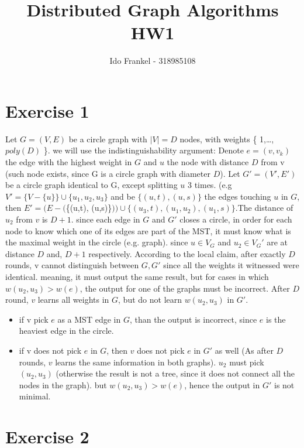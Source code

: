 \documentclass[11pt]{article}
\begin{document}
\author{Ido Frankel - 318985108}
\title{Distributed Graph Algorithms HW1}
\maketitle

\medskip

\section{Exercise 1}
Let $G=(V,E)$ be a circle graph with $|V|=D$ nodes, with weights \{ 1,…, $poly(D)$ \}. we will use the indistinguishability argument: Denote $e=(v,v_k)$ the edge with the highest weight in $G$ and $u$ the node with distance $D$ from v (such node exists, since G is a circle graph with diameter $D$). Let $G'=(V',E')$ be a circle graph identical to G, except splitting $u$ 3 times. (e.g $V'=\{V-\{u\}\}\cup{\{u_1,u_2,u_3\}}$ and be $\{(u,t), (u,s)\}$ the edges touching $u$ in $G$,
then $E'=(E-($\{(u,t), (u,s)\}$)) \cup{\{(u_3,t), (u_1,u_2), (u_1,s)\}}$.The distance of $u_2$ from $v$ is $D+1$. since each edge in $G$ and $G'$ closes a circle, in order for each node to know which one of its edges are part of the MST, it must know what is the maximal weight in the circle (e.g. graph). since $u\in V_G$ and $u_2\in V_G'$ are at distance $D$ and, $D+1$ respectively. According to the local claim, after exactly $D$ rounds, v cannot distinguish between $G,G'$ since all the weights it witnessed were identical. meaning, it must output the same result, but for cases in which $w(u_2,u_3)>w(e)$, the output for one of the graphs must be incorrect.
\newline
 After $D$ round, $v$ learns all weights in $G$, but do not learn $w(u_2,u_3)$ in $G'$.
\begin{itemize}
    \item if v pick $e$ as a MST edge in $G$, than the output is incorrect, since $e$ is the heaviest edge in the circle.
    \item if v does not pick $e$ in $G$, then $v$ does not pick $e$ in $G'$ as well (As after $D$ rounds, $v$ learns the same information in both graphs). $u_2$ must pick $(u_2,u_3)$ (otherwise the result is not a tree, since it does not connect all the nodes in the graph). but $w(u_2,u_3) > w(e)$, hence the output in $G'$ is not minimal.
\end{itemize}

\section{Exercise 2}
\end{document}
